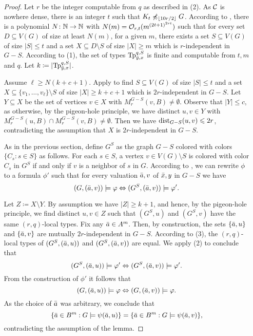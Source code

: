 \begin{proof}
Let $r$
be the integer computable from $q$ as described in  (2). 
As $\mathcal{C}$ is nowhere dense, there is an integer $t$ such that 
$K_t\not\preccurlyeq_{\lfloor 10r/2\rfloor} G$. According to 
, there is a polynomial  $N\colon \mathbb{N}\to \mathbb{N}$ with $N(m)=
\mathcal{O}_{r,t}{(m^{{(2t+1)}^{2rt}})}$ such that for every set $D\subseteq V(G)$
of size at least $N(m)$, for a given $m$, there exists a set $S\subseteq V(G)$ of size $|S|\leq t$ 
and a set $X\subseteq D\setminus S$ of size $|X|\geq m$ which is $r$-independent in $G-S$.
According to  (1), the set of types $\mathrm{Tp}^{q,S}_{\bar{y},x}$ is 
finite and computable from $t,m$ and $q$. Let $k\coloneqq |\mathrm{Tp}^{q,S}_{\bar{y},x}|$. 

Assume $\ell\geq N(k+c+1)$. Apply  to find $S\subseteq V(G)$ of size $|S|\leq t$ 
and a set $X\subseteq \{v_1,\ldots, v_\ell\}\setminus S$ of size $|X|\geq k+c+1$ which is 
$2r$-independent in $G-S$. Let $Y\subseteq X$ be the set of vertices $v\in X$ 
with $M_r^{G-S}(v,B)\neq \emptyset$. Observe that $|Y|\leq c$, as otherwise, by the pigeon-hole 
principle, we have distinct $u,v\in Y$ with $M_r^{G-S}(u,B)\cap M_r^{G-S}(v,B)\neq \emptyset$. 
Then we have $\mathrm{dist}_{G-S}(u,v)\leqslant 2r$, contradicting the assumption that 
$X$ is $2r$-independent in $G-S$. 

As in the previous section, define $G^S$ as the graph $G-S$
colored with colors $\{C_s : s\in S\}$ as follows. For each $s\in S$, a vertex $v\in V(G)\setminus S$
is colored with color $C_s$ in $G^S$ if and only if $v$ is a neighbor of $s$ in $G$. 
According to , we can rewrite $\phi$ to a formula $\phi'$ such that
for every valuation $\bar{a},v$ of $\bar{x},y$ in $G-S$ we have 
\[(G,(\bar{a},v))\models \varphi\Leftrightarrow (G^S,(\bar{a},v))\models \varphi'.\]

Let $Z\coloneqq X\setminus Y$. By assumption we have $|Z|\geq k+1$, and hence, by 
the pigeon-hole principle, we find distinct $u,v\in Z$ such that 
$(G^S,u)$ and $(G^S,v)$ have the same $(r,q)$-local types. Fix any $\bar{a}\in A^m$. 
Then, by construction, the sets $\{\bar{a}, u\}$ and $\{\bar{a},v\}$ are mutually $2r$-independent
in $G-S$. 
According to  (3), the $(r,q)$-local types of $(G^S,(\bar{a},u))$ and 
$(G^S,(\bar{a},v))$ are equal. We apply  (2) to conclude that 
\[(G^S, (\bar{a},u))\models \varphi'\Leftrightarrow(G^S, (\bar{a},v))\models \varphi'.\]
From the construction of $\phi'$ it follows that 
\[(G, (\bar{a},u))\models \varphi\Leftrightarrow(G, (\bar{a},v))\models \varphi.\]
As the choice of $\bar{a}$ was arbitrary, we conclude that 
\[\{\bar{a} \in B^m : G\models\psi(\bar{a},u)\}= \{\bar{a} \in B^m : G\models\psi(\bar{a},v)\},\]
contradicting the assumption of the lemma. 
\end{proof}


